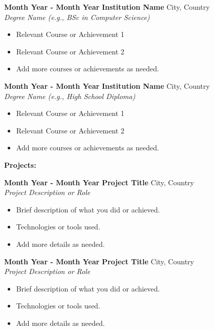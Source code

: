 \documentclass[a4paper,10pt]{article}
\begin{document}
\textbf{Month Year - Month Year} \hfill \textbf{Institution Name} \hfill City, Country\\
\textit{Degree Name (e.g., BSc in Computer Science)}
\begin{itemize}
    \item Relevant Course or Achievement 1
    \item Relevant Course or Achievement 2
    \item Add more courses or achievements as needed.
\end{itemize}

\vspace{5pt}

\textbf{Month Year - Month Year} \hfill \textbf{Institution Name} \hfill City, Country\\
\textit{Degree Name (e.g., High School Diploma)}
\begin{itemize}
    \item Relevant Course or Achievement 1
    \item Relevant Course or Achievement 2
    \item Add more courses or achievements as needed.
\end{itemize}

\vspace{5pt}

\textbf{Projects:}

\vspace{5pt}

\textbf{Month Year - Month Year} \hfill \textbf{Project Title} \hfill City, Country\\
\textit{Project Description or Role}
\begin{itemize}
    \item Brief description of what you did or achieved.
    \item Technologies or tools used.
    \item Add more details as needed.
\end{itemize}

\vspace{5pt}

\textbf{Month Year - Month Year} \hfill \textbf{Project Title} \hfill City, Country\\
\textit{Project Description or Role}
\begin{itemize}
    \item Brief description of what you did or achieved.
    \item Technologies or tools used.
    \item Add more details as needed.
\end{itemize}
\end{document}
